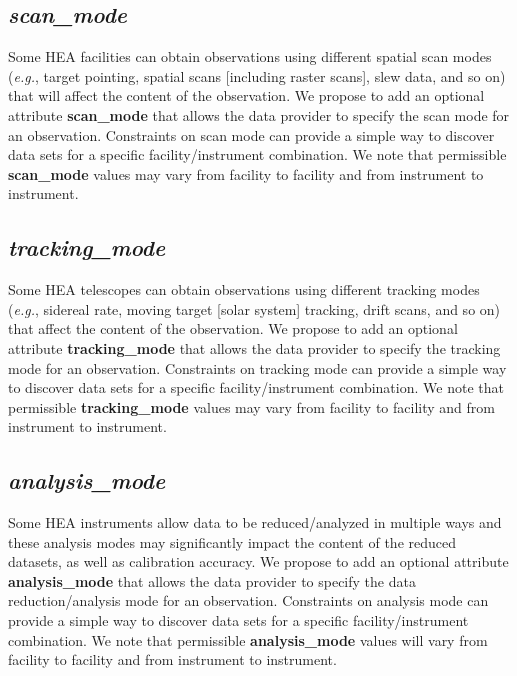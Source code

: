 \documentclass[11pt,a4paper]{ivoa}
\begin{document}
\subsection{{\em scan\_mode}}

Some HEA facilities can obtain observations using different spatial scan modes ({\em e.g.\/}, target pointing, spatial scans [including raster scans], slew data, and so on) that will affect the content of the observation.  We propose to add an optional attribute {\bf scan\_mode} that allows the data provider to specify the scan mode for an observation.  Constraints on scan mode can provide a simple way to discover data sets for a specific facility/instrument combination.  We note that permissible {\bf scan\_mode} values may vary from facility to facility and from instrument to instrument.

\subsection{{\em tracking\_mode}}

Some HEA telescopes can obtain observations using different tracking modes ({\em e.g.\/}, sidereal rate, moving target [solar system] tracking, drift scans, and so on) that affect the content of the observation.  We propose to add an optional attribute {\bf tracking\_mode} that allows the data provider to specify the tracking mode for an observation.  Constraints on tracking mode can provide a simple way to discover data sets for a specific facility/instrument combination.  We note that permissible {\bf tracking\_mode} values may vary from facility to facility and from instrument to instrument.

\subsection{{\em analysis\_mode}}

Some HEA instruments allow data to be reduced/analyzed in multiple ways and these analysis modes may significantly impact the content of the reduced datasets, as well as calibration accuracy.  We propose to add an optional attribute {\bf analysis\_mode} that allows the data provider to specify the data reduction/analysis mode for an observation.  Constraints on analysis mode can provide a simple way to discover data sets for a specific facility/instrument combination.  We note that permissible {\bf analysis\_mode} values will vary from facility to facility and from instrument to instrument.
\end{document}
